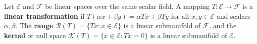 Let $\mathcal{E}$ and $\mathcal{F}$ be linear spaces over the same scalar field. A mapping $T : \mathcal{E} \to \mathcal{F}$ is a \textbf{linear transformation} if $T(\alpha x + \beta y) = \alpha T x + \beta T y$ for all $x, y \in \mathcal{E}$ and scalars $\alpha, \beta$. The \textbf{range} $\mathcal{R}(T) = \{T x : x \in \mathcal{E}\}$ is a linear submanifold of $\mathcal{F}$, and the \textbf{kernel} or null space $\mathcal{K}(T) = \{x \in \mathcal{E} : T x = 0\}$ is a linear submanifold of $\mathcal{E}$.

